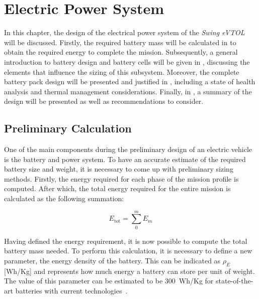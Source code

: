 \chapter{Electric Power System}
\label{ch:eps}
In this chapter, the design of the electrical power system of the \textit{Swing eVTOL} will be discussed.
Firstly, the required battery mass will be calculated in  to obtain the required energy to complete the mission. 
Subsequently, a general introduction to battery design and battery cells will be given in , discussing the elements that influence the sizing of this subsystem. 
Moreover, the complete battery pack design will be presented and justified in , including a state of health analysis and thermal management considerations. 
Finally, in , a summary of the design will be presented as well as recommendations to consider.

\section{Preliminary Calculation}
\label{sec:prelim_calc}
One of the main components during the preliminary design of an electric vehicle is the battery and power system.
To have an accurate estimate of the required battery size and weight,
it is necessary to come up with preliminary sizing methods.
Firstly, the energy required for each phase of the mission profile is computed.
After which, the total energy required for the entire mission is calculated as the following summation:

\begin{equation}
    E_\text{tot} = \sum_{0}^{m} E_{m}
\end{equation}

Having defined the energy requirement, it is now possible to compute the total battery mass needed.
To perform this calculation, it is necessary to define a new parameter, the energy density of the battery.
This can be indicated as $\rho_E$[Wh/Kg] and represents how much energy a battery can store per unit of weight.
The value of this parameter can be estimated to be \qty{300}{Wh/Kg} for state-of-the-art batteries with current technologies~\cite{stateartbat}.

